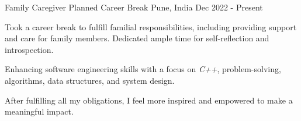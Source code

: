 


\begin{cventries}

\cventry
{Family Caregiver}
{Planned Career Break}
{Pune, India}
{Dec 2022 - Present}
{
\begin{cvitems}
\item {Took a career break to fulfill familial responsibilities, including providing support and care for family members.
       Dedicated ample time for self-reflection and introspection.}
\item {Enhancing software engineering skills with a focus on \textit{C++}, problem-solving, algorithms, data structures, and system design.}
\item {After fulfilling all my obligations, I feel more inspired and empowered to make a meaningful impact.}
\end{cvitems}
}


\end{cventries}
